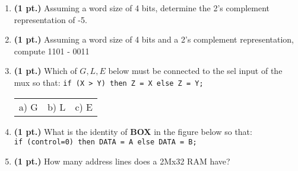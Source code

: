 \documentclass{article}
\begin{document}
\begin{enumerate}
\item {\bf (1 pt.)} Assuming a word size of 4 bits, determine the 2's complement
representation of -5.

\item {\bf (1 pt.)} Assuming a word size of 4 bits and a 2's complement representation,
compute  1101 - 0011

\pagebreak
\item {\bf (1 pt.)} Which of $G,L,E$ below must be connected to the 
sel input of the mux so that:
\verb+if (X > Y) then Z = X else Z = Y;+


\begin{tabular}{lll}
a) G & b)  L & c)  E \\ 
\end{tabular}

\item {\bf (1 pt.)} What is the identity of {\bf BOX} in the figure below so that: \\
\verb+if (control=0) then DATA = A else DATA = B;+



\item {\bf (1 pt.)} How many address lines does a 2Mx32 RAM have?


\end{enumerate}
\end{document}

